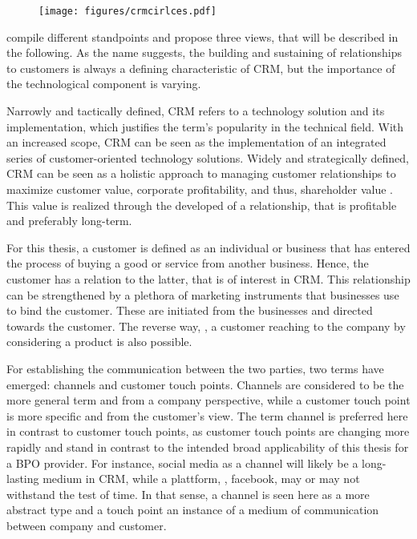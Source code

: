 		
		\begin{figure}[caption={CRM in the field of marketing}, label={fig:crmcirlces}]
			{	\texttt{[image: figures/crmcirlces.pdf]}}
		\end{figure}
	
		\cite{paynefrow2005} compile different standpoints and propose three views, that will be described in the following. As the name suggests, the building and sustaining of relationships to customers is always a defining characteristic of \acrshort{CRM}, but the importance of the technological component is varying. 
		
		Narrowly and tactically defined, \acrshort{CRM} refers to a technology solution and its implementation, which justifies the term's popularity in the technical field. With an increased scope, \acrshort{CRM} can be seen as the implementation of an integrated series of customer-oriented technology solutions. Widely and strategically defined, \acrshort{CRM} can be seen as a holistic approach to managing customer relationships to maximize customer value, corporate profitability, and thus, shareholder value \cite{payne2004role}. This value is realized through the developed of a relationship, that is profitable and preferably long-term. 
	
		For this thesis, a customer is defined as an individual or business that has entered the process of buying a good or service from another business. Hence, the customer has a relation to the latter, that is of interest in CRM. This relationship can be strengthened by a plethora of marketing instruments that businesses use to bind the customer. These are initiated from the businesses and directed towards the customer. The reverse way, \ie, a customer reaching to the company by considering a product is also possible.  
		
		 For establishing the communication between the two parties, two terms have emerged: channels and customer touch points. Channels are considered to be the more general term and from a company perspective, while a customer touch point is more specific and from the customer's view. The term channel is preferred here in contrast to customer touch points, as customer touch points are changing more rapidly and stand in contrast to the intended broad applicability of this thesis for a BPO provider. For instance, social media as a channel will likely be a long-lasting medium in CRM, while a plattform, \ie, facebook, may or may not withstand the test of time. In that sense, a channel is seen here as a more abstract type and a touch point an instance of a medium of communication between company and customer. 
		
